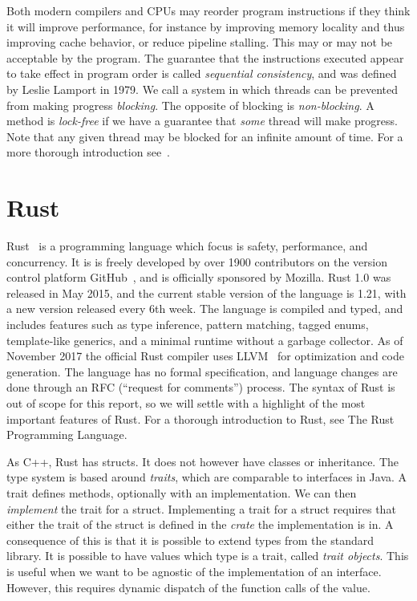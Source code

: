 \documentclass[b5paper]{report}
\begin{document}
Both modern compilers and CPUs may reorder program instructions if they think
it will improve performance, for instance by improving memory locality and thus
improving cache behavior, or reduce pipeline stalling. This may or may not be
acceptable by the program. The guarantee that the instructions executed appear
to take effect in program order is called \emph{sequential consistency}, and
was defined by Leslie Lamport in 1979. We call a system in
which threads can be prevented from making progress \emph{blocking}. The
opposite of blocking is \emph{non-blocking}. A method is \emph{lock-free} if we
have a guarantee that \emph{some} thread will make progress. Note that any given
thread may be blocked for an infinite amount of time. For a more thorough
introduction see~\cite{herlihy2011art}.




\section{Rust}\label{sec:rust}

Rust~\cite{rust} is a programming language which focus is safety, performance,
and concurrency. It is is freely developed by over 1900 contributors on the
version control platform GitHub~\cite{github}, and is officially sponsored by
Mozilla. Rust 1.0 was released in May 2015, and the current stable version of
the language is 1.21, with a new version released every 6th week. The language
is compiled and typed, and includes features such as type inference, pattern
matching, tagged enums, template-like generics, and a minimal runtime without a
garbage collector. As of November 2017 the official Rust compiler 
uses LLVM~\cite{llvm} for optimization and code generation. The language has no
formal specification, and language changes are done through an RFC (``request
for comments'') process. The syntax of Rust is out of scope for this report, so
we will settle with a highlight of the most important features of Rust. For a
thorough introduction to Rust, see The Rust Programming Language\cite{trpl}.

As C++, Rust has structs. It does not however have classes or inheritance. The
type system is based around \emph{traits}, which are comparable to interfaces in
Java. A trait defines methods, optionally with an implementation. We can then
\emph{implement} the trait for a struct. Implementing a trait for a struct
requires that either the trait of the struct is defined in the \emph{crate} the
implementation is in. A consequence of this is that it is possible to extend
types from the standard library. It is possible to have values which type is a
trait, called \emph{trait objects}. This is useful when we want to be agnostic
of the implementation of an interface. However, this requires dynamic dispatch
of the function calls of the value.
\end{document}
